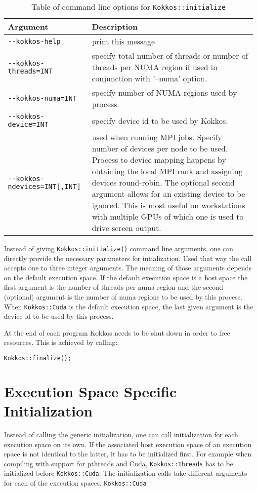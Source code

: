 \begin{table}
\caption{Table of command line options for \lstinline|Kokkos::initialize|}
\label{TBL:CommandLineOptions}
\begin{small}
\begin{tabular}[t]{lp{}}
\hline
Argument & Description \\\hline
\lstinline|--kokkos-help| & print this message \\
\lstinline|--kokkos-threads=INT| & 
specify total number of threads or number of threads per NUMA region if used in conjunction with '--numa' option. \\
\lstinline|--kokkos-numa=INT| & specify number of NUMA regions used by process. \\
\lstinline|--kokkos-device=INT| & specify device id to be used by Kokkos. \\
\lstinline|--kokkos-ndevices=INT[,INT]| & used when running MPI jobs. Specify number of
devices per node to be used. Process to device
mapping happens by obtaining the local MPI rank
and assigning devices round-robin. The optional
second argument allows for an existing device
to be ignored. This is most useful on workstations
with multiple GPUs of which one is used to drive
screen output.\\
\hline
\end{tabular}
\end{small}
\end{table}

Instead of giving \lstinline|Kokkos::initialize()| command line arguments, one can directly provide the necessary parameters for intialization.
Used that way the call accepts one to three integer arguments. The meaning of those arguments depends on the default execution space. 
If the default execution space is a host space the first argument is the number of threads per numa region and the second (optional) argument is the number of numa regions to be used by this process.
When \lstinline|Kokkos::Cuda| is the default execution space, the last given argument is the device id to be used by this process. 

At the end of each program Kokkos needs to be shut down in order to free resources. 
This is achieved by calling:
\begin{lstlisting}
Kokkos::finalize(); 
\end{lstlisting}

\section{Execution Space Specific Initialization}

Instead of calling the generic initialization, one can call initialization for each execution space on its own. 
If the associated host execution space of an execution space is not identical to the latter, it has to be initialized first.
For example when compiling with support for pthreads and Cuda, \lstinline|Kokkos::Threads| has to be initialized before \lstinline|Kokkos::Cuda|.
The initialization calls take different arguments for each of the execution spaces.
\lstinline|Kokkos::Cuda| 




